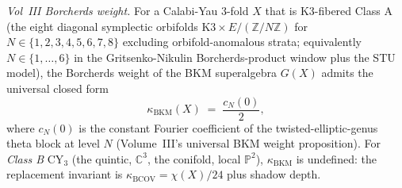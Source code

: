 \emph{Vol~III Borcherds weight.} For a Calabi-Yau $3$-fold $X$
that is K3-fibered Class A (the eight diagonal symplectic orbifolds
$\mathrm{K3} \times E / (\mathbb{Z}/N\mathbb{Z})$ for
$N \in \{1, 2, 3, 4, 5, 6, 7, 8\}$ excluding orbifold-anomalous
strata; equivalently $N \in \{1, \ldots, 6\}$ in the
Gritsenko-Nikulin Borcherds-product window plus the STU model), the
Borcherds weight of the BKM superalgebra $G(X)$ admits the
universal closed form
\[
 \kappa_{\mathrm{BKM}}(X) \;=\; \frac{c_{N}(0)}{2},
\]
where $c_{N}(0)$ is the constant Fourier coefficient of the
twisted-elliptic-genus theta block at level $N$
(Volume~III's universal BKM weight proposition). For
\emph{Class B} CY$_{3}$ (the quintic, $\mathbb{C}^{3}$, the
conifold, local $\mathbb{P}^{2}$), $\kappa_{\mathrm{BKM}}$ is
undefined: the replacement invariant is
$\kappa_{\mathrm{BCOV}} = \chi(X)/24$ plus shadow depth.


